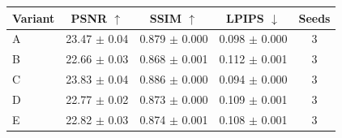 \begin{tabular}{lcccc}
\toprule
Variant & PSNR $\uparrow$ & SSIM $\uparrow$ & LPIPS $\downarrow$ & Seeds \\
\midrule
A & 23.47 $\pm$ 0.04 & 0.879 $\pm$ 0.000 & 0.098 $\pm$ 0.000 & 3 \\
B & 22.66 $\pm$ 0.03 & 0.868 $\pm$ 0.001 & 0.112 $\pm$ 0.001 & 3 \\
C & 23.83 $\pm$ 0.04 & 0.886 $\pm$ 0.000 & 0.094 $\pm$ 0.000 & 3 \\
D & 22.77 $\pm$ 0.02 & 0.873 $\pm$ 0.000 & 0.109 $\pm$ 0.001 & 3 \\
E & 22.82 $\pm$ 0.03 & 0.874 $\pm$ 0.001 & 0.108 $\pm$ 0.001 & 3 \\
\bottomrule
\end{tabular}

